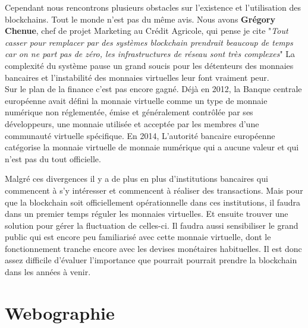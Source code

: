\documentclass[12pt]{report}
\begin{document}
\hspace{1cm} Cependant nous rencontrons plusieurs obstacles sur l'existence et l'utilisation des blockchains. Tout le monde n'est pas du même avis. Nous avons \textbf{Grégory Chenue}, chef de projet Marketing au Crédit Agricole, qui pense je cite "\textit{Tout casser pour remplacer par des systèmes blockchain prendrait beaucoup de temps car on ne part pas de zéro, les infrastructures de réseau sont très complexes}" La complexité du système pause un grand soucis pour les détenteurs des monnaies bancaires et l'instabilité des monnaies virtuelles leur font vraiment peur. \\

\hspace{1cm} Sur le plan de la finance c'est pas encore gagné. Déjà en 2012, la Banque centrale européenne avait défini la monnaie virtuelle comme un type de monnaie numérique non réglementée, émise et généralement contrôlée par ses développeurs, une monnaie utilisée et acceptée par les membres d'une communauté virtuelle spécifique. En 2014, L'autorité bancaire européenne catégorise la monnaie virtuelle de monnaie numérique qui a aucune valeur et qui n'est pas du tout officielle.

\hspace{1cm} Malgré ces divergences il y a de plus en plus d'institutions bancaires qui commencent à s'y intéresser et commencent à réaliser des transactions. Mais pour que la blockchain soit officiellement opérationnelle dans ces institutions, il faudra dans un premier temps réguler les monnaies virtuelles. Et ensuite trouver une solution pour gérer la fluctuation de celles-ci. Il faudra aussi sensibiliser le grand public qui est encore peu familiarisé avec cette monnaie virtuelle, dont le fonctionnement tranche encore avec les devises monétaires habituelles. Il est donc assez difficile d’évaluer l’importance que pourrait pourrait prendre la blockchain dans les années à venir.\\

\newpage
\section{Webographie}
\end{document}
